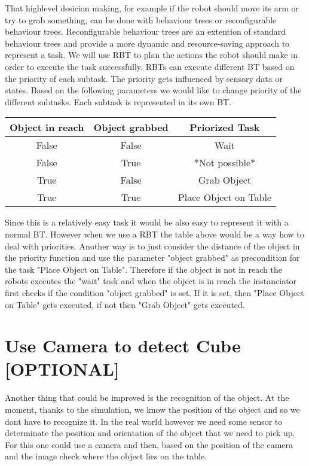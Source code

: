 \documentclass[report]{iisthesis}
\begin{document}
That highlevel desicion making, for example if the robot should move its arm or try to grab something, can be done with behaviour trees or reconfigurable behaviour trees.
Reconfigurable behaviour trees are an extention of standard behaviour trees and provide a more dynamic and resource-saving approach to represent a task.
We will use RBT to plan the actions the robot should make in order to execute the task successfully. RBTs can execute different BT based on the priority of each subtask. The priority gets influenced by sensory data or states.
Based on the following parameters we would like to change priority of the different subtasks. Each subtask is represented in its own BT.
\begin{center}
    \begin{tabular}{ |c|c||c|  }
        \hline
        Object in reach & Object grabbed & Priorized Task \\
        \hline
        \hline
        False & False & Wait \\
        False & True & *Not possible* \\
        True & False & Grab Object \\ 
        True & True & Place Object on Table \\
        \hline
    \end{tabular}
\end{center}

Since this is a relatively easy task it would be also easy to represent it with a normal BT. However when we use a RBT the table above would be a way how to deal with priorities. Another way is to just consider the distance of the object in the priority function and use the parameter "object grabbed" as precondition for the task "Place Object on Table".
Therefore if the object is not in reach the robots executes the "wait" task and when the object is in reach the instanciator first checks if the condition "object grabbed" is set. If it is set, then "Place Object on Table" gets executed, if not then "Grab Object" gets executed.

\section{Use Camera to detect Cube [OPTIONAL]}

Another thing that could be improved is the recognition of the object. At the moment, thanks to the simulation, we know the position of the object and so we dont have to recognize it. In the real world however we need some sensor to determinate the position and orientation of the object that we need to pick up. For this one could use a camera and then, based on the position of the camera and the image check where the object lies on the table.
\end{document}
